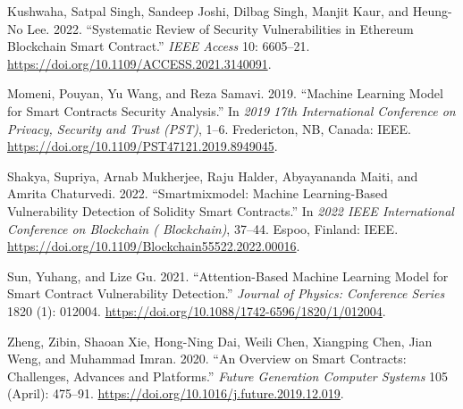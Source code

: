 \documentclass[
  11pt,
]{article}
\newlength{\cslhangindent}
\newlength{\cslentryspacingunit} %
\newenvironment{CSLReferences}[2] %
 {%
  \setlength{\parindent}{0pt}
  \ifodd #1
  \let\oldpar\par
  \def\par{\hangindent=\cslhangindent\oldpar}
  \fi
  \setlength{\parskip}{#2\cslentryspacingunit}
 }%
 {}
\begin{document}
\begin{CSLReferences}{1}{0}
\leavevmode{}%
Kushwaha, Satpal Singh, Sandeep Joshi, Dilbag Singh, Manjit Kaur, and
Heung-No Lee. 2022. {``Systematic Review of Security Vulnerabilities in
Ethereum Blockchain Smart Contract.''} \emph{IEEE Access} 10: 6605--21.
\url{https://doi.org/10.1109/ACCESS.2021.3140091}.

\leavevmode{}%
Momeni, Pouyan, Yu Wang, and Reza Samavi. 2019. {``Machine Learning
Model for Smart Contracts Security Analysis.''} In \emph{2019 17th
{International} {Conference} on {Privacy}, {Security} and {Trust}
({PST})}, 1--6. Fredericton, NB, Canada: IEEE.
\url{https://doi.org/10.1109/PST47121.2019.8949045}.

\leavevmode{}%
Shakya, Supriya, Arnab Mukherjee, Raju Halder, Abyayananda Maiti, and
Amrita Chaturvedi. 2022. {``Smartmixmodel: Machine Learning-Based
Vulnerability Detection of Solidity Smart Contracts.''} In \emph{2022
{IEEE} {International} {Conference} on {Blockchain} ({ Blockchain})},
37--44. Espoo, Finland: IEEE.
\url{https://doi.org/10.1109/Blockchain55522.2022.00016}.

\leavevmode{}%
Sun, Yuhang, and Lize Gu. 2021. {``Attention-Based Machine Learning
Model for Smart Contract Vulnerability Detection.''} \emph{Journal of
Physics: Conference Series} 1820 (1): 012004.
\url{https://doi.org/10.1088/1742-6596/1820/1/012004}.

\leavevmode{}%
Zheng, Zibin, Shaoan Xie, Hong-Ning Dai, Weili Chen, Xiangping Chen,
Jian Weng, and Muhammad Imran. 2020. {``An Overview on Smart Contracts:
{Challenges}, Advances and Platforms.''} \emph{Future Generation
Computer Systems} 105 (April): 475--91.
\url{https://doi.org/10.1016/j.future.2019.12.019}.

\end{CSLReferences}
\end{document}
